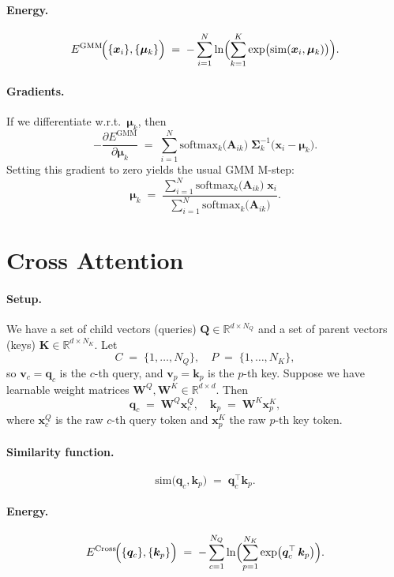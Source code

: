 \documentclass{article}
\begin{document}
\paragraph{Energy.}
\begin{equation}
E^{\mathrm{GMM}}\!\Bigl(\{\bm{x}_i\}, \{\bm{\mu}_k\}\Bigr)
\;=\;
-\sum_{i=1}^N
\ln \Bigl(\sum_{k=1}^K
\exp\bigl(\mathrm{sim}(\bm{x}_i,\bm{\mu}_k)\bigr)\Bigr).
\end{equation}

\paragraph{Gradients.}
If we differentiate w.r.t.\ \(\bm{\mu}_k\), then
\[
-\frac{\partial E^{\mathrm{GMM}}}{\partial \bm{\mu}_k}
\;=\;
\sum_{i=1}^N 
\text{softmax}_k\!\bigl(\bm{A}_{ik}\bigr)
\;\bm{\Sigma}_k^{-1}\bigl(\bm{x}_i - \bm{\mu}_k\bigr).
\]
Setting this gradient to zero yields the usual GMM M-step:
\[
\bm{\mu}_k
\;=\;
\frac{\sum_{i=1}^N 
\text{softmax}_k\!\bigl(\bm{A}_{ik}\bigr)\;\bm{x}_i}
     {\sum_{i=1}^N
     \text{softmax}_k\!\bigl(\bm{A}_{ik}\bigr)}.
\]


\section{Cross Attention}

\paragraph{Setup.}
We have a set of child vectors (queries) \(\bm{Q}\in\mathbb{R}^{d\times N_Q}\) and a set of parent vectors (keys) \(\bm{K}\in\mathbb{R}^{d\times N_K}\).  Let
\[
C \;=\;\{1,\ldots,N_Q\}, 
\quad
P \;=\;\{1,\ldots,N_K\},
\]
so \(\bm{v}_c = \bm{q}_c\) is the \(c\)-th query, and \(\bm{v}_p = \bm{k}_p\) is the \(p\)-th key.  Suppose we have learnable weight matrices \(\bm{W}^Q,\bm{W}^K \in \mathbb{R}^{d \times d}\).  Then
\[
\bm{q}_c 
\;=\;
\bm{W}^Q\bm{x}^Q_c,
\quad
\bm{k}_p 
\;=\;
\bm{W}^K\bm{x}^K_p,
\]
where \(\bm{x}^Q_c\) is the raw \(c\)-th query token and \(\bm{x}^K_p\) the raw \(p\)-th key token.

\paragraph{Similarity function.}
\[
\mathrm{sim}\bigl(\bm{q}_c, \bm{k}_p\bigr)
\;=\;
\bm{q}_c^\top \bm{k}_p.
\]

\paragraph{Energy.}
\begin{equation}
E^{\mathrm{Cross}}\!\Bigl(\{\bm{q}_c\}, \{\bm{k}_p\}\Bigr)
\;=\;
-\sum_{c=1}^{N_Q}
\ln \Bigl(\sum_{p=1}^{N_K}
\exp\bigl(\bm{q}_c^\top\,\bm{k}_p\bigr)\Bigr).
\end{equation}
\end{document}
